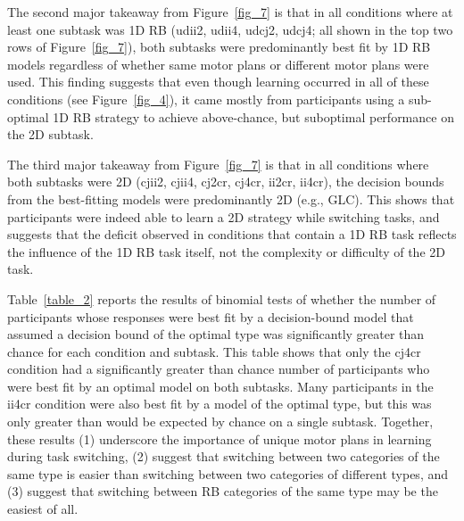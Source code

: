 \documentclass[doc, floatsintext]{apa7}
\begin{document}
The second major takeaway from Figure~\ref{fig_7} is that in
all conditions where at least one subtask was 1D RB (udii2,
udii4, udcj2, udcj4; all shown in the top two rows of
Figure~\ref{fig_7}), both subtasks were predominantly best
fit by 1D RB models regardless of whether same motor plans
or different motor plans were used. This finding suggests
that even though learning occurred in all of these
conditions (see Figure~\ref{fig_4}), it came mostly from
participants using a sub-optimal 1D RB strategy to achieve
above-chance, but suboptimal performance on the 2D subtask.

The third major takeaway from Figure~\ref{fig_7} is that in
all conditions where both subtasks were 2D (cjii2, cjii4,
cj2cr, cj4cr, ii2cr, ii4cr), the decision bounds from the
best-fitting models were predominantly 2D (e.g., GLC). This
shows that participants were indeed able to learn a 2D
strategy while switching tasks, and suggests that the
deficit observed in conditions that contain a 1D RB task
reflects the influence of the 1D RB task itself, not the
complexity or difficulty of the 2D task.

Table~\ref{table_2} reports the results of binomial tests of
whether the number of participants whose responses were best
fit by a decision-bound model that assumed a decision bound
of the optimal type was significantly greater than chance
for each condition and subtask. This table shows that only
the cj4cr condition had a significantly greater than chance
number of participants who were best fit by an optimal model
on both subtasks. Many participants in the ii4cr condition
were also best fit by a model of the optimal type, but this
was only greater than would be expected by chance on a
single subtask. Together, these results (1) underscore the
importance of unique motor plans in learning during task
switching, (2) suggest that switching between two categories
of the same type is easier than switching between two
categories of different types, and (3) suggest that
switching between RB categories of the same type may be the
easiest of all.
\end{document}
